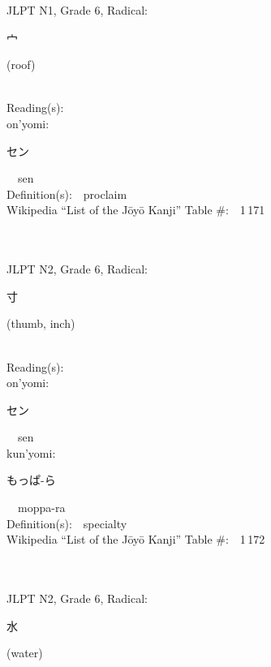 \begin{multicols}{2}
{JLPT N1, Grade 6, Radical:\ \ {\begin{CJK}{UTF8}{min} 宀 \end{CJK}} (roof) } \\
Reading(s):\ \ \\
{\hspace*{1em}}on'yomi:\ \ \\
{\hspace*{2em}}{\begin{CJK}{UTF8}{min} セン \end{CJK}}\ \ sen\ \ \\
Definition(s):\ \ proclaim \\
Wikipedia ``List of the J\=oy\=o Kanji'' Table \#:\ \ 1\,171 \\
\ \ \\
{\fontsize{34pt}{40pt}  }\ \ \\  %
{JLPT N2, Grade 6, Radical:\ \ {\begin{CJK}{UTF8}{min} 寸 \end{CJK}} (thumb, inch) } \\
Reading(s):\ \ \\
{\hspace*{1em}}on'yomi:\ \ \\
{\hspace*{2em}}{\begin{CJK}{UTF8}{min} セン \end{CJK}}\ \ sen\ \ \\
{\hspace*{1em}}kun'yomi:\ \ \\
{\hspace*{2em}}{\begin{CJK}{UTF8}{min} もっぱ-ら \end{CJK}}\ \ moppa-ra\ \ \\
Definition(s):\ \ specialty \\
Wikipedia ``List of the J\=oy\=o Kanji'' Table \#:\ \ 1\,172 \\
\ \ \\
{\fontsize{34pt}{40pt}  }\ \ \\  %
{JLPT N2, Grade 6, Radical:\ \ {\begin{CJK}{UTF8}{min} 水 \end{CJK}} (water) } \\

\end{multicols}

